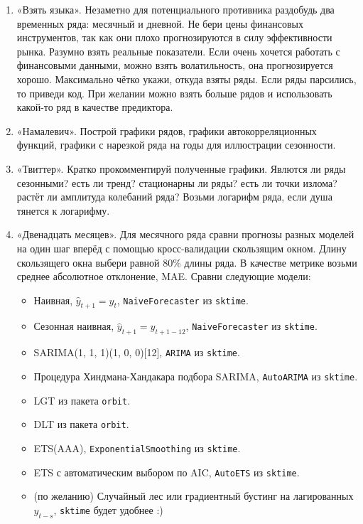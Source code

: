 \documentclass[12pt]{article}
\begin{document}
\begin{enumerate}
    \item «Взять языка». Незаметно для потенциального противника раздобудь два временных ряда: месячный и дневной. 
    Не бери цены финансовых инструментов, так как они плохо прогнозируются в силу эффективности рынка.
    Разумно взять реальные показатели. Если очень хочется работать с финансовыми данными, можно взять волатильность, 
    она прогнозируется хорошо. Максимально чётко укажи, откуда взяты ряды. Если ряды парсились, то приведи код. 
    При желании можно взять больше рядов и использовать какой-то ряд в качестве предиктора. 

    \item «Намалевич». Построй графики рядов, графики автокорреляционных функций, графики с нарезкой ряда на годы для иллюстрации сезонности. 
    
    \item «Твиттер». Кратко прокомментируй полученные графики. 
    Явлются ли ряды сезонными? есть ли тренд? стационарны ли ряды? есть ли точки излома? растёт ли амплитуда колебаний ряда?
    Возьми логарифм ряда, если душа тянется к логарифму.


    \item «Двенадцать месяцев». Для месячного ряда сравни прогнозы разных моделей на один шаг вперёд с помощью кросс-валидации скользящим окном. 
    Длину скользящего окна выбери равной 80\% длины ряда. В качестве метрике возьми среднее абсолютное отклонение, MAE. 
    Сравни следующие модели:

    \begin{itemize}
        \item Наивная, $\hat y_{t+1} = y_t$, \verb|NaiveForecaster| из \verb|sktime|.
        \item Сезонная наивная, $\hat y_{t+1} = y_{t + 1 - 12}$, \verb|NaiveForecaster| из \verb|sktime|.
        \item SARIMA(1, 1, 1)(1, 0, 0)[12], \verb|ARIMA| из \verb|sktime|.
        \item Процедура Хиндмана-Хандакара подбора SARIMA, \verb|AutoARIMA| из \verb|sktime|.
        \item LGT из пакета \verb|orbit|.
        \item DLT из пакета \verb|orbit|.
        \item ETS(AAA), \verb|ExponentialSmoothing| из \verb|sktime|.
        \item ETS с автоматическим выбором по AIC, \verb|AutoETS| из \verb|sktime|.
        \item (по желанию) Случайный лес или градиентный бустинг на лагированных $y_{t-s}$, \verb|sktime| будет удобнее :)
    \end{itemize}


\end{enumerate}
\end{document}
